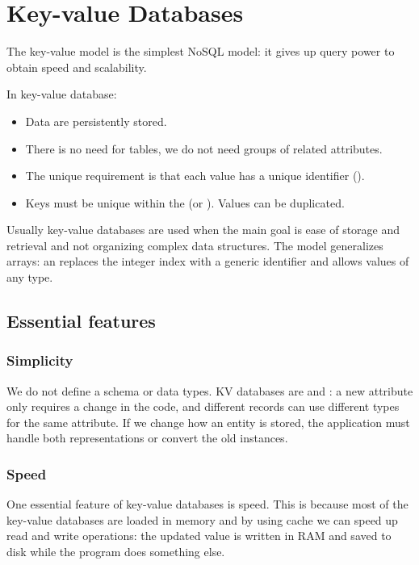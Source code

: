 \section{Key-value Databases}\label{sec:kv}

The key-value model is the simplest NoSQL model: it gives up query power to obtain speed and scalability.

In key-value database:
\begin{itemize}
    \item Data are persistently stored.
    \item There is no need for tables, we do not need groups of related attributes.
    \item The unique requirement is that each value has a unique identifier ().
    \item Keys must be unique within the  (or ). Values can be duplicated.
\end{itemize}

Usually key-value databases are used when the main goal is ease of storage and retrieval and not organizing complex data structures. The model generalizes arrays: an  replaces the integer index with a generic identifier and allows values of any type.

\subsection{Essential features}

\subsubsection{Simplicity}
We do not define a schema or data types. KV databases are  and : a new attribute only requires a change in the code, and different records can use different types for the same attribute. If we change how an entity is stored, the application must handle both representations or convert the old instances.

\subsubsection{Speed}
One essential feature of key-value databases is speed. This is because most of the key-value databases are loaded in memory and by using cache we can speed up read and write operations: the updated value is written in RAM and saved to disk while the program does something else.

